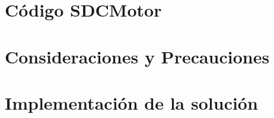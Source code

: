 \documentclass[
	spanish, %
	letterpaper, oneside
]{article}
\begin{document}
	
\templatePortrait

\templatePagecfg


\templateIndex

\templateFinalcfg


\newpage


\newpage 
\section{Código SDCMotor}
\label{sec:codigo_SDCMotor}


\newpage
\section{Consideraciones y Precauciones}
\label{sec:consideraciones_y_precauciones}


%

\newpage
\section{Implementación de la solución}
\label{sec:solucion}




\newpage

\end{document}
